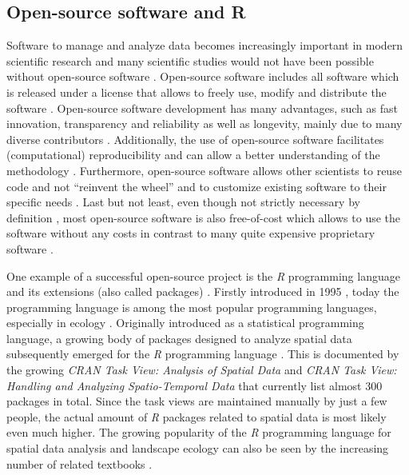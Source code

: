 \documentclass[smallextended]{svjour3}       %
\begin{document}
\hypertarget{sec:open_source}{%
\subsection{Open-source software and R}\label{sec:open_source}}

Software to manage and analyze data becomes increasingly important in modern scientific research \cite{Wilson2014} and many scientific studies would not have been possible without open-source software \cite{Prlic2012}.
Open-source software includes all software which is released under a license that allows to freely use, modify and distribute the software \cite{St.Laurent2008}.
Open-source software development has many advantages, such as fast innovation, transparency and reliability as well as longevity, mainly due to many diverse contributors \cite{vonKrogh2006,St.Laurent2008}.
Additionally, the use of open-source software facilitates (computational) reproducibility and can allow a better understanding of the methodology \cite{Prlic2012,Powers2019}.
Furthermore, open-source software allows other scientists to reuse code and not ``reinvent the wheel'' \cite{Prlic2012} and to customize existing software to their specific needs \cite{Steiniger2009}.
Last but not least, even though not strictly necessary by definition \cite{Steiniger2009,Steiniger2009a}, most open-source software is also free-of-cost which allows to use the software without any costs in contrast to many quite expensive proprietary software \cite{vonKrogh2006,Steiniger2009,Steiniger2009a}.

One example of a successful open-source project is the \emph{R} programming language and its extensions (also called packages) \cite{RCoreTeam2019}.
Firstly introduced in 1995 \cite{Smith2016}, today the programming language is among the most popular programming languages, especially in ecology \cite{Lai2019}.
Originally introduced as a statistical programming language, a growing body of packages designed to analyze spatial data subsequently emerged for the \emph{R} programming language \cite{Bivand2006}.
This is documented by the growing \emph{CRAN Task View: Analysis of Spatial Data} \cite{Bivand2019a} and \emph{CRAN Task View: Handling and Analyzing Spatio-Temporal Data} \cite{Pebesma2020} that currently list almost 300 packages in total.
Since the task views are maintained manually by just a few people, the actual amount of \emph{R} packages related to spatial data is most likely even much higher.
The growing popularity of the \emph{R} programming language for spatial data analysis and landscape ecology can also be seen by the increasing number of related textbooks \cite{Fletcher2019,Lovelace2019,Pebesma2019a}.
\end{document}
